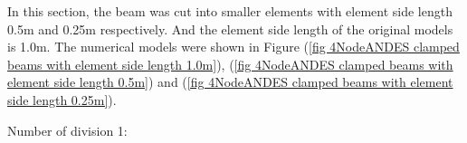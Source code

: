 \documentclass[fleqn,11pt]{article}
\begin{document}









% 




\newpage
In this section, the beam was cut into smaller elements with element side length 0.5m and 0.25m respectively. And the element side length of the original models is 1.0m. The numerical models were shown in Figure (\ref{fig 4NodeANDES clamped beams with element side length 1.0m}), (\ref{fig 4NodeANDES clamped beams with element side length 0.5m}) and (\ref{fig 4NodeANDES clamped beams with element side length 0.25m}). 

Number of division 1:
\end{document}
